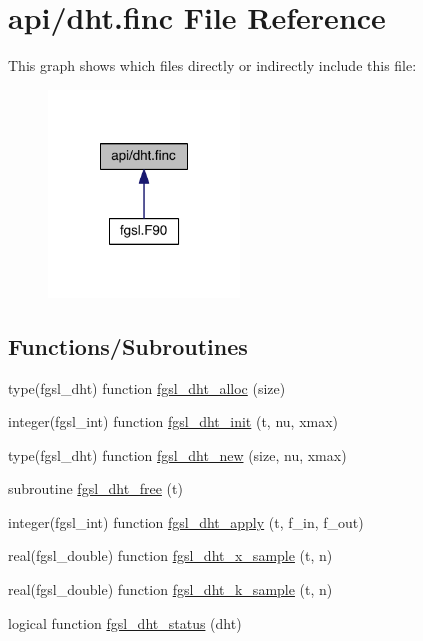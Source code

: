 \hypertarget{dht_8finc}{\section{api/dht.finc File Reference}
\label{dht_8finc}
}
This graph shows which files directly or indirectly include this file\-:
\nopagebreak
\begin{figure}[H]
\begin{center}
\leavevmode
\includegraphics[width=144pt]{dht_8finc__dep__incl}
\end{center}
\end{figure}
\subsection*{Functions/\-Subroutines}
\begin{DoxyCompactItemize}
\item 
type(fgsl\-\_\-dht) function \hyperlink{dht_8finc_afb86f7c8f57dc3d670480fedf967ecd4}{fgsl\-\_\-dht\-\_\-alloc} (size)
\item 
integer(fgsl\-\_\-int) function \hyperlink{dht_8finc_abb2bcd0254c3b7209be2be3e92ff3fa6}{fgsl\-\_\-dht\-\_\-init} (t, nu, xmax)
\item 
type(fgsl\-\_\-dht) function \hyperlink{dht_8finc_adea7d327ef1817dee38b9425de98585b}{fgsl\-\_\-dht\-\_\-new} (size, nu, xmax)
\item 
subroutine \hyperlink{dht_8finc_ae26b17e9d3a3a0e428ace07554351086}{fgsl\-\_\-dht\-\_\-free} (t)
\item 
integer(fgsl\-\_\-int) function \hyperlink{dht_8finc_a587dbba2d2d50e3e07d1f4ba1a7a1989}{fgsl\-\_\-dht\-\_\-apply} (t, f\-\_\-in, f\-\_\-out)
\item 
real(fgsl\-\_\-double) function \hyperlink{dht_8finc_af6b6534c16d8cfcfaeae9ea4ea9fa3c4}{fgsl\-\_\-dht\-\_\-x\-\_\-sample} (t, n)
\item 
real(fgsl\-\_\-double) function \hyperlink{dht_8finc_ab0250953195cfe60a32a5c5d532fdf75}{fgsl\-\_\-dht\-\_\-k\-\_\-sample} (t, n)
\item 
logical function \hyperlink{dht_8finc_a58dc6a67e94415bb013e635effcefa24}{fgsl\-\_\-dht\-\_\-status} (dht)
\end{DoxyCompactItemize}


